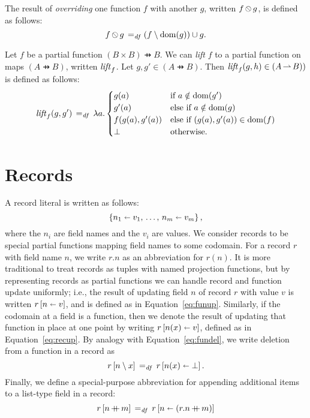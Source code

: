 \documentclass[11pt]{report}
\begin{document}
The result of \emph{overriding} one function $f$ with another $g$, written $f \override g$, is defined as follows: \[ f \override g \eqdef (f \setminus \dom{g}) \cup g.\] 

Let $f$ be a partial function $(B \times B) \pfun B$. We can \emph{lift} $f$ to a partial function on maps $(A \pfun B)$, written $\mathit{lift}_{f}$. Let $g,g' \in (A \pfun B)$. Then $\mathit{lift}_{f}(g,h) \in (A \operatorname{\rightharpoonup} B))$ is defined as follows: \begin{eqnarray*}
	\mathit{lift}_{f}(g,g') \operatorname{\;=_{\mathit{df}}\;} \lambda a . \begin{cases}
		g(a) & \text{if $a \notin \operatorname{\mathrm{dom}}(g')$} \\
		g'(a) & \text{else if $a \notin \operatorname{\mathrm{dom}}(g)$} \\
		f(g(a), g'(a)) & \text{else if $(g(a), g'(a)) \in \operatorname{\mathrm{dom}}(f)$} \\
		\bot & \text{otherwise.}
	\end{cases}
\end{eqnarray*}  


\section{Records} %
\label{sec:records}

A record literal is written as follows: \[ \left\lbrace n_1 \shortleftarrow v_1,\,\ldots,\, n_m \shortleftarrow v_m \right\rbrace,\] where the $n_i$ are field names and the $v_i$ are values. We consider records to be special partial functions mapping field names to some codomain. For a record $r$ with field name $n$, we write $r.n$ as an abbreviation for $r(n)$. It is more traditional to treat records as tuples with named projection functions, but by representing records as partial functions we can handle record and function update uniformly; i.e., the result of updating field $n$ of record $r$ with value $v$ is written $r \left[ n \shortleftarrow v \right]$, and is defined as in Equation~\ref{eq:funup}. Similarly, if the codomain at a field is a function, then we denote the result of updating that function in place at one point by writing $r \left[ n(x) \shortleftarrow v \right]$, defined as in Equation~\ref{eq:recup}. By analogy with Equation~\ref{eq:fundel}, we write deletion from a function in a record as \begin{equation}
	\label{eq:recdel}
	r \left[ n \setminus x \right] \operatorname{\;=_{\mathit{df}}\;} r \left[ n(x) \shortleftarrow \bot \right].
\end{equation} Finally, we define a special-purpose abbreviation for appending additional items to a list-type field in a record: \begin{equation}
	\label{eq:ptapp}
	r \left[ n \operatorname{+\!\!\!+} m \right] \operatorname{\;=_{\mathit{df}}\;} r \left[ n \shortleftarrow (r.n \operatorname{+\!\!\!+} m) \right] 
\end{equation}
\end{document}
